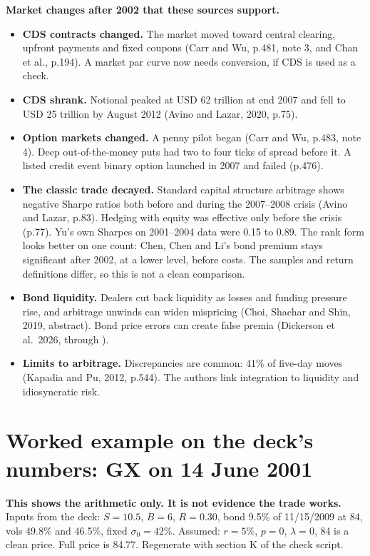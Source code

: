\documentclass[10pt,a4paper]{article}
\begin{document}
\textbf{Market changes after 2002 that these sources support.}
\begin{itemize}[nosep]
\item \textbf{CDS contracts changed.} The market moved toward central clearing, upfront payments and fixed coupons (Carr and Wu, p.481, note 3, and Chan et al., p.194). A market par curve now needs conversion, if CDS is used as a check.
\item \textbf{CDS shrank.} Notional peaked at USD 62 trillion at end 2007 and fell to USD 25 trillion by August 2012 (Avino and Lazar, 2020, p.75).
\item \textbf{Option markets changed.} A penny pilot began (Carr and Wu, p.483, note 4). Deep out-of-the-money puts had two to four ticks of spread before it. A listed credit event binary option launched in 2007 and failed (p.476).
\item \textbf{The classic trade decayed.} Standard capital structure arbitrage shows negative Sharpe ratios both before and during the 2007--2008 crisis (Avino and Lazar, p.83). Hedging with equity was effective only before the crisis (p.77). Yu's own Sharpes on 2001--2004 data were 0.15 to 0.89. The rank form looks better on one count: Chen, Chen and Li's bond premium stays significant after 2002, at a lower level, before costs. The samples and return definitions differ, so this is not a clean comparison.
\item \textbf{Bond liquidity.} Dealers cut back liquidity as losses and funding pressure rise, and arbitrage unwinds can widen mispricing (Choi, Shachar and Shin, 2019, abstract). Bond price errors can create false premia (Dickerson et al.\ 2026, through ).
\item \textbf{Limits to arbitrage.} Discrepancies are common: 41\% of five-day moves (Kapadia and Pu, 2012, p.544). The authors link integration to liquidity and idiosyncratic risk.
\end{itemize}

\appendix
\section{Worked example on the deck's numbers: GX on 14 June 2001}\label{app:gx}

\textbf{This shows the arithmetic only. It is not evidence the trade works.} Inputs from the deck: $S=10.5$, $B=6$, $R=0.30$, bond 9.5\% of 11/15/2009 at 84, vols 49.8\% and 46.5\%, fixed $\sigma_0=42\%$. Assumed: $r=5\%$, $p=0$, $\lambda=0$, 84 is a clean price. Full price is 84.77. Regenerate with section K of the check script.
\end{document}
